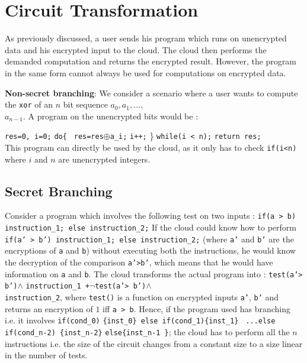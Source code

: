 \documentclass{acm_proc_article-sp}
\begin{document}
\section{Circuit Transformation}
As previously discussed, a user sends his program which runs on unencrypted data and his encrypted input to the cloud. The cloud then performs the demanded computation and returns the encrypted result. However, the program in the same form cannot always be used for computations on encrypted data. 

\textbf{Non-secret branching}: We consider a scenario where a user wants to compute the \texttt{xor} of an $n$ bit sequence $a_0,a_1,\ldots,$ \\ $a_{n-1}$. A program on the unencrypted bits would be :

 \phantom{x} \texttt{res=0, i=0;}
\newline \phantom{x} \texttt{do\{ }
\newline \phantom{x} \hspace{9ex} \texttt{res=res$\oplus$a\_i;}
\newline \phantom{x} \hspace{9ex} \texttt{i++;} 
\newline   \phantom{x} \} \texttt{while(i < n);} 
\newline  \phantom{x} \texttt{return res;}\\

This program can directly be used by the cloud, as it only has to check \texttt{if(i<n)} where $i$ and $n$ are unencrypted integers.

\subsection{Secret Branching}

Consider a program which involves the following test on two inputs : \texttt{if(a > b) instruction\_1; else instruction\_2;} If the cloud could know how to perform \texttt{if(a' > b') instruction\_1; else instruction\_2;} (where \texttt{a'} and \texttt{b'} are the encryptions of \texttt{a} and \texttt{b}) without executing both the instructions, he would know the decryption of the comparison \texttt{a'>b'}, which means that he would have information on \texttt{a} and \texttt{b}. The cloud transforms the actual program into : \texttt{test(a'> b')$\wedge$} \texttt{instruction\_1 +}$\neg$\texttt{test(a'> b')$\wedge$ } \\ \texttt{instruction\_2}, where \texttt{test()}  is a function on encrypted inputs \texttt{a'}, \texttt{b'} and returns an encryption of $1$ iff \texttt{a > b}. Hence, if the program used has branching i.e. it involves \texttt{if(cond\_0)} \texttt{\{inst\_0\} else if(cond\_1)\{inst\_1\}} \texttt{ ...else if(cond\_n-2) \{inst\_n-2\}} \texttt{else\{inst\_n-1 \}}; the cloud has to perform all the $n$ instructions i.e. the size of the circuit changes from a constant size to a size linear in the number of tests.
\end{document}
